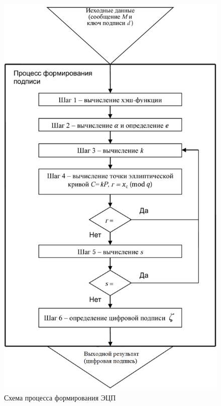 \begin{figure}[H]
	\centering
	\includegraphics[width=0.62\linewidth]{inc/img/4_1}
	\caption{Схема процесса формирования ЭЦП}
	\label{fig:fig4_1}
\end{figure}

